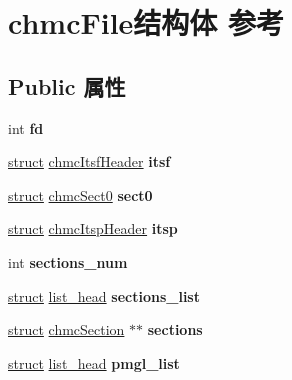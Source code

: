 \hypertarget{structchmc_file}{}\section{chmc\+File结构体 参考}
\label{structchmc_file}
\subsection*{Public 属性}
\begin{DoxyCompactItemize}
\item 
\mbox{\label{structchmc_file_a5f6fa327a2e01df9224006bfc6abbc67}} 
int {\bfseries fd}
\item 
\mbox{\label{structchmc_file_a35e08c1a7b2f1cbebe2dd8feccd6b336}} 
\hyperlink{interfacestruct}{struct} \hyperlink{structchmc_itsf_header}{chmc\+Itsf\+Header} {\bfseries itsf}
\item 
\mbox{\label{structchmc_file_a7cf6532dcdb42c68609e35437cda22dc}} 
\hyperlink{interfacestruct}{struct} \hyperlink{structchmc_sect0}{chmc\+Sect0} {\bfseries sect0}
\item 
\mbox{\label{structchmc_file_a9becd926209e4533ccb869a00ecadba0}} 
\hyperlink{interfacestruct}{struct} \hyperlink{structchmc_itsp_header}{chmc\+Itsp\+Header} {\bfseries itsp}
\item 
\mbox{\label{structchmc_file_a8b4d3055d541a6b4fb397514658d8da4}} 
int {\bfseries sections\+\_\+num}
\item 
\mbox{\label{structchmc_file_aba0ef7d86411f7ece0bf93305e34b1c6}} 
\hyperlink{interfacestruct}{struct} \hyperlink{structlist__head}{list\+\_\+head} {\bfseries sections\+\_\+list}
\item 
\mbox{\label{structchmc_file_a2488a7bc6a62459d56c3e99ab8f701fa}} 
\hyperlink{interfacestruct}{struct} \hyperlink{structchmc_section}{chmc\+Section} $\ast$$\ast$ {\bfseries sections}
\item 
\mbox{\label{structchmc_file_a72d3b29c65e3c6894c8a12f80ef3833b}} 
\hyperlink{interfacestruct}{struct} \hyperlink{structlist__head}{list\+\_\+head} {\bfseries pmgl\+\_\+list}
$$
\end{DoxyCompactItemize}
